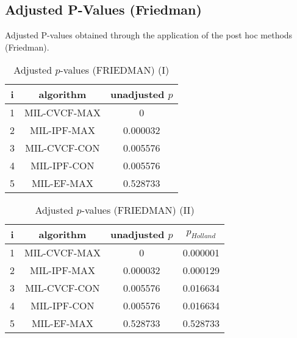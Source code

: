 \documentclass[a4paper,10pt]{article}
\begin{document}
\begin{landscape}
\newpage

\section{Adjusted P-Values (Friedman)}


Adjusted P-values obtained through the application of the post hoc methods (Friedman).

\begin{table}[!htp]
\centering\small
\begin{tabular}{ccc}
i&algorithm&unadjusted $p$\\
\hline1&MIL-CVCF-MAX&0\\2&MIL-IPF-MAX&0.000032\\3&MIL-CVCF-CON&0.005576\\4&MIL-IPF-CON&0.005576\\5&MIL-EF-MAX&0.528733\\\hline
\end{tabular}
\caption{Adjusted $p$-values (FRIEDMAN) (I)}
\end{table}
\begin{table}[!htp]
\centering\small
\begin{tabular}{cccc}
i&algorithm&unadjusted $p$&$p_{Holland}$\\
\hline1&MIL-CVCF-MAX&0&0.000001\\2&MIL-IPF-MAX&0.000032&0.000129\\3&MIL-CVCF-CON&0.005576&0.016634\\4&MIL-IPF-CON&0.005576&0.016634\\5&MIL-EF-MAX&0.528733&0.528733\\\hline
\end{tabular}
\caption{Adjusted $p$-values (FRIEDMAN) (II)}
\end{table}

\newpage
\end{landscape}
\end{document}

